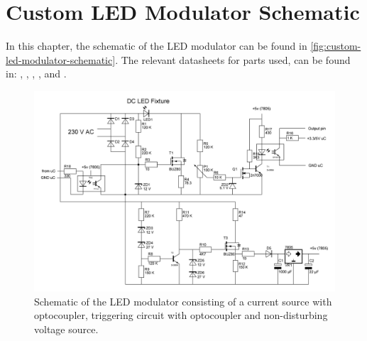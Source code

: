 
\chapter{Custom LED Modulator Schematic}
\label{app:custom-led-modulator-schematic}

In this chapter, the schematic of the LED modulator can be found in \autoref{fig:custom-led-modulator-schematic}.
The relevant datasheets for parts used, can be found in: \cite{lm7805-vr-datasheet}, \cite{2n7000-n-fet-datasheet}, \cite{sfh617a-optocoupler-datasheet}, \cite{h11l1-optocoupler-datasheet}, \cite{buz80-n-fet-datasheet} and \cite{2n3904-npn-transistor-datasheet}.


\begin{figure}[htb]
	\includegraphics[angle=90,width=\textwidth,height=.9\textheight,keepaspectratio]{chapters/appendix/custom-modulator/custom-modulator-schematic.jpg}
	\caption{Schematic of the LED modulator consisting of a current source with optocoupler, triggering circuit with optocoupler and non-disturbing voltage source.}
	\label{fig:custom-led-modulator-schematic}
\end{figure}
